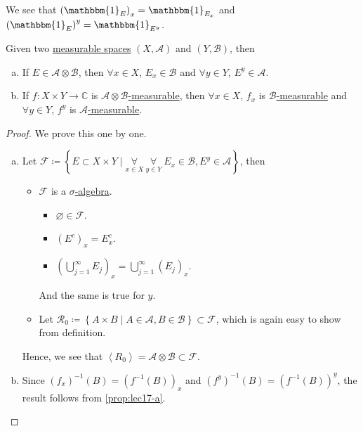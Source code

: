 \begin{eg}
	We see that \(\left(\mathbbm{1}_{E} \right)_x = \mathbbm{1}_{E_x}\) and \(\left(\mathbbm{1}_{E} \right)^y = \mathbbm{1}_{E^y}\).
\end{eg}

\begin{proposition}
	Given two \hyperref[def:measurable-space]{measurable spaces} \((X, \mathcal{A} )\) and \((Y, \mathcal{B} )\), then
	\begin{enumerate}[(a)]
		\item\label{prop:lec17-a} If \(E\in \mathcal{A} \otimes \mathcal{B}\), then \(\forall x \in X\), \(E_x \in \mathcal{B} \) and \(\forall y \in Y\), \(E^y \in \mathcal{A} \).
		\item\label{prop:lec17-b} If \(f\colon X\times Y\to \mathbb{C} \) is \hyperref[def:A-measurable-function]{\(\mathcal{A} \otimes \mathcal{B} \)-measurable}, then \(\forall x\in X\), \(f_x\) is \hyperref[def:A-measurable-function]{\(\mathcal{B}\)-measurable} and \(\forall y \in Y\), \(f^y\) is \hyperref[def:A-measurable-function]{\(\mathcal{A}\)-measurable}.
	\end{enumerate}
\end{proposition}
\begin{proof}
	We prove this one by one.
	\begin{enumerate}[(a)]
		\item Let \(\mathcal{F} \coloneqq \left\{E\subset X\times Y \mid \underset{x\in X}{\forall }\ \underset{y\in Y}{\forall }\ E_x\in \mathcal{B} , E^y\in \mathcal{A}\right\}\), then
		      \begin{itemize}
			      \item \(\mathcal{F} \) is a \hyperref[def:sigma-algebra]{\(\sigma\)-algebra}.
			            \begin{itemize}
				            \item \(\varnothing \in \mathcal{F} \).
				            \item \((E^{c} )_x = E_{x}^{c}\).
				            \item \(\left(\bigcup_{j=1}^{\infty} E_{j} \right)_x = \bigcup_{j=1}^{\infty} (E_{j} )_{x} \).
			            \end{itemize}
			            And the same is true for \(y\).
			      \item Let \(\mathcal{R} _0 \coloneqq \left\{A\times B \mid A\in \mathcal{A} , B\in \mathcal{B} \right\}\subset \mathcal{F}\), which is again easy to show from definition.
		      \end{itemize}
		      Hence, we see that \(\left< R_0 \right> = \mathcal{A} \otimes \mathcal{B} \subset \mathcal{F} \).
		\item Since \((f_{x} )^{-1} (B) = (f^{-1} (B))_{x}\) and \((f^{y} )^{-1} ({B} ) = (f^{-1} (B))^{y}\), the result follows from \autoref{prop:lec17-a}.
	\end{enumerate}
\end{proof}

